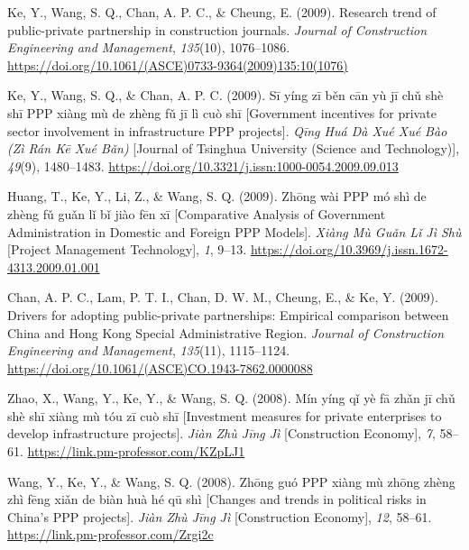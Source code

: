 \documentclass[11pt,a4paper]{report} %
\begin{document}
\begin{tablist}
        \item[2009] \tab{}Ke, Y., Wang, S. Q., Chan, A. P. C., \& Cheung, E. (2009). Research trend of public-private partnership in construction journals. \textit{Journal of Construction Engineering and Management}, \textit{135}(10), 1076--1086. \href{https://doi.org/10.1061/(ASCE)0733-9364(2009)135:10(1076)}{https://doi.org/10.1061/(ASCE)0733-9364(2009)135:10(1076)}
        
        \item[2009] \tab{}Ke, Y., Wang, S. Q., \& Chan, A. P. C. (2009). Sī yíng zī běn cān yù jī chǔ shè shī PPP xiàng mù de zhèng fǔ jī lì cuò shī [Government incentives for private sector involvement in infrastructure PPP projects]. \textit{Qīng Huá Dà Xué Xué Bào (Zì Rán Kē Xué Bǎn)} [Journal of Tsinghua University (Science and Technology)], \textit{49}(9), 1480--1483. \href{https://doi.org/10.3321/j.issn:1000-0054.2009.09.013}{https://doi.org/10.3321/j.issn:1000-0054.2009.09.013}
        
        \item[2009] \tab{}Huang, T., Ke, Y., Li, Z., \& Wang, S. Q. (2009). Zhōng wài PPP mó shì de zhèng fǔ guǎn lǐ bǐ jiào fēn xī [Comparative Analysis of Government Administration in Domestic and Foreign PPP Models]. \textit{Xiàng Mù Guǎn Lǐ Jì Shù} [Project Management Technology], \textit{1}, 9--13. \href{https://doi.org/10.3969/j.issn.1672-4313.2009.01.001}{https://doi.org/10.3969/j.issn.1672-4313.2009.01.001}
        
        \item[2009] \tab{}Chan, A. P. C., Lam, P. T. I., Chan, D. W. M., Cheung, E., \& Ke, Y. (2009). Drivers for adopting public-private partnerships: Empirical comparison between China and Hong Kong Special Administrative Region. \textit{Journal of Construction Engineering and Management}, \textit{135}(11), 1115--1124. \href{https://doi.org/10.1061/(ASCE)CO.1943-7862.0000088}{https://doi.org/10.1061/(ASCE)CO.1943-7862.0000088}
        
        \item[2008] \tab{}Zhao, X., Wang, Y., Ke, Y., \& Wang, S. Q. (2008). Mín yíng qǐ yè fā zhǎn jī chǔ shè shī xiàng mù tóu zī cuò shī [Investment measures for private enterprises to develop infrastructure projects]. \textit{Jiàn Zhù Jīng Jì} [Construction Economy], \textit{7}, 58--61. \href{https://link.pm-professor.com/KZpLJ1}{https://link.pm-professor.com/KZpLJ1}
        
        \item[2008] \tab{}Wang, Y., Ke, Y., \& Wang, S. Q. (2008). Zhōng guó PPP xiàng mù zhōng zhèng zhì fēng xiǎn de biàn huà hé qū shì [Changes and trends in political risks in China’s PPP projects]. \textit{Jiàn Zhù Jīng Jì} [Construction Economy], \textit{12}, 58--61. \href{https://link.pm-professor.com/Zrgi2c}{https://link.pm-professor.com/Zrgi2c}
        

\end{tablist}
\end{document}
